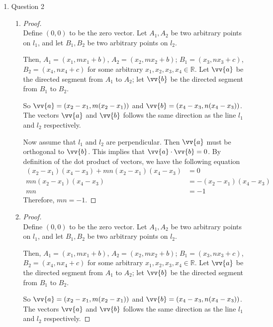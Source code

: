 \documentclass[11pt]{article}
\def\R {{\mathbb R}}
\begin{document}
\begin{enumerate}
    \item Question 2
    \begin{enumerate}
        \item
        \begin{proof}
        \hfill \\
        Define $(0,0)$ to be the zero vector. Let $A_1,A_2$ be two arbitrary points on $l_1$, and let $B_1,B_2$ be two arbitrary points on $l_2$.
        
        Then, $A_1=(x_1,mx_1+b)$, $A_2=(x_2,mx_2+b)$; $B_1=(x_3,nx_3+c)$, $B_2=(x_4,nx_4+c)$ for some arbitrary $x_1,x_2,x_3,x_4 \in\R$. Let $\vv{a}$ be the directed segment from $A_1$ to $A_2$; let $\vv{b}$ be the directed segment from $B_1$ to $B_2$.
        
        So $\vv{a} = (x_2-x_1, m(x_2-x_1))$ and $\vv{b} = (x_4-x_3, n(x_4-x_3))$. The vectors $\vv{a}$ and $\vv{b}$ follows the same direction as the line $l_1$ and $l_2$ respectively.
        
        Now assume that $l_1$ and $l_2$ are perpendicular. Then $\vv{a}$ must be orthogonal to $\vv{b}$. This implies that $\vv{a}\cdot\vv{b}=0$. By definition of the dot product of vectors, we have the following equation
        \begin{align*}
            (x_2-x_1)(x_4-x_3) + mn(x_2-x_1)(x_4-x_3) &= 0 \\
            mn(x_2-x_1)(x_4-x_3) &= -(x_2-x_1)(x_4-x_3) \\
            mn &= -1
        \end{align*}
        Therefore, $mn=-1$.
        \end{proof}
        
        \item
        \begin{proof}
        \hfill \\
        Define $(0,0)$ to be the zero vector. Let $A_1,A_2$ be two arbitrary points on $l_1$, and let $B_1,B_2$ be two arbitrary points on $l_2$.
        
        Then, $A_1=(x_1,mx_1+b)$, $A_2=(x_2,mx_2+b)$; $B_1=(x_3,nx_3+c)$, $B_2=(x_4,nx_4+c)$ for some arbitrary $x_1,x_2,x_3,x_4 \in\R$. Let $\vv{a}$ be the directed segment from $A_1$ to $A_2$; let $\vv{b}$ be the directed segment from $B_1$ to $B_2$.
        
        So $\vv{a} = (x_2-x_1, m(x_2-x_1))$ and $\vv{b} = (x_4-x_3, n(x_4-x_3))$. The vectors $\vv{a}$ and $\vv{b}$ follows the same direction as the line $l_1$ and $l_2$ respectively.
        

\end{proof}
\end{enumerate}
\end{enumerate}
\end{document}
